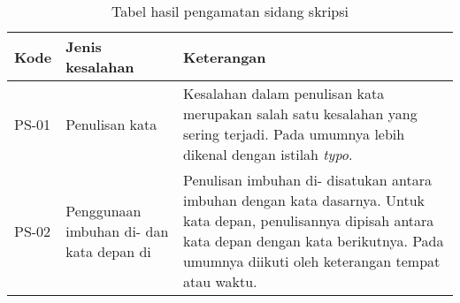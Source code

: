 \begin{table}[H]
	\renewcommand{\arraystretch}{1.5}
	\caption {Tabel hasil pengamatan sidang skripsi} \label{tab:hasil_sidang1}
	\begin{center}
		\begin{tabular}{|p{1.5 cm}|>{\raggedright} p{5.5 cm}| p{7.5 cm}|}
		\hline
		Kode & Jenis kesalahan & Keterangan \\ 
		\hline
		PS-01 & Penulisan kata & Kesalahan dalam penulisan kata merupakan salah satu kesalahan yang sering terjadi. Pada umumnya lebih dikenal dengan istilah \textit{typo}. \newline \\ 
		\hline 
		PS-02 & Penggunaan imbuhan di- dan kata depan di & Penulisan imbuhan di- disatukan antara imbuhan dengan kata dasarnya. Untuk kata depan, penulisannya dipisah antara kata depan dengan kata berikutnya. Pada umumnya diikuti oleh keterangan tempat atau waktu. \newline \\ 
		\hline 
		\end{tabular}
	\end{center}
\end{table}

